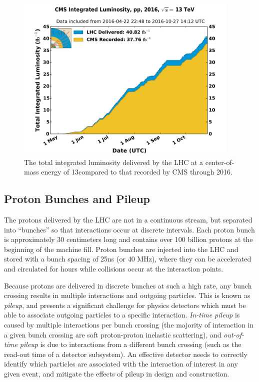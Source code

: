\begin{figure}
	\centering
	\includegraphics[width=0.95\textwidth]{detector/figs/int_lumi_per_day_cumulative_pp_2016}
	\renewcommand{\baselinestretch}{1.0}
	\caption[The total integrated luminosity delivered by the LHC at a center-of-mass energy of 13\TeV compared to that recorded by CMS through 2016.]{The total integrated luminosity delivered by the LHC at a center-of-mass energy of 13\TeV compared to that recorded by CMS through 2016.}
	\label{fig:lumi}
\end{figure}

\subsection{Proton Bunches and Pileup}
\label{subsec:pileup}

The protons delivered by the LHC are not in a continuous stream, but separated into ``bunches'' so that interactions occur at discrete intervals. Each proton bunch is approximately 30 centimeters long and contains over 100 billion protons at the beginning of the machine fill. Proton bunches are injected into the LHC and stored with a bunch spacing of 25ns (or 40 MHz), where they can be accelerated and circulated for hours while collisions occur at the interaction points.

Because protons are delivered in discrete bunches at such a high rate, any bunch crossing results in multiple interactions and outgoing particles. This is known as {\it pileup}, and presents a significant challenge for physics detectors which must be able to associate outgoing particles to a specific interaction. {\it In-time pileup} is caused by multiple interactions per bunch crossing (the majority of interaction in a given bunch crossing are soft proton-proton inelastic scattering), and {\it out-of-time pileup} is due to interactions from a different bunch crossing (such as the read-out time of a detector subsystem). An effective detector needs to correctly identify which particles are associated with the interaction of interest in any given event, and mitigate the effects of pileup in design and construction.


